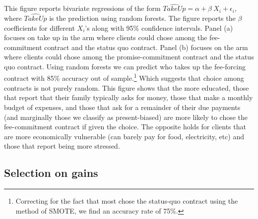 \documentclass[oneside,11pt]{article}
\begin{document}
\scriptsize {
\noindent This figure reports bivariate regressions of the form $\widehat{TakeUp} = \alpha + \beta \: X_i + \epsilon_i$, where $\widehat{TakeUp}$ is the prediction using random forests. The figure reports the $\beta$ coefficients for different $X_i$'s along with 95\% confidence intervals. Panel (a) focuses on take up in the arm where clients could chose among the fee-commitment contract and the status quo contract. Panel (b) focuses on the arm where clients could chose among the promise-commitment contract and the status quo contract. Using random forests we can predict who takes up the fee-forcing contract with 85\% accuracy out of sample.\footnote{Correcting for the fact that most chose the status-quo contract using the method of SMOTE, \cite{smote} we find an accuracy rate of 75\%.} Which suggests that choice among contracts is not purely random. This figure shows that the more educated, those that report that their family typically asks for money, those that make a monthly budget of expenses, and those that ask for a remainder of their due payments (and marginally those we classify as present-biased) are more likely to chose the fee-commitment contract if given the choice. The opposite holds for clients that are more economically vulnerable (can barely pay for food, electricity, etc) and those that report being more stressed.
}

\newpage

\subsection{Selection on gains}
\end{document}
